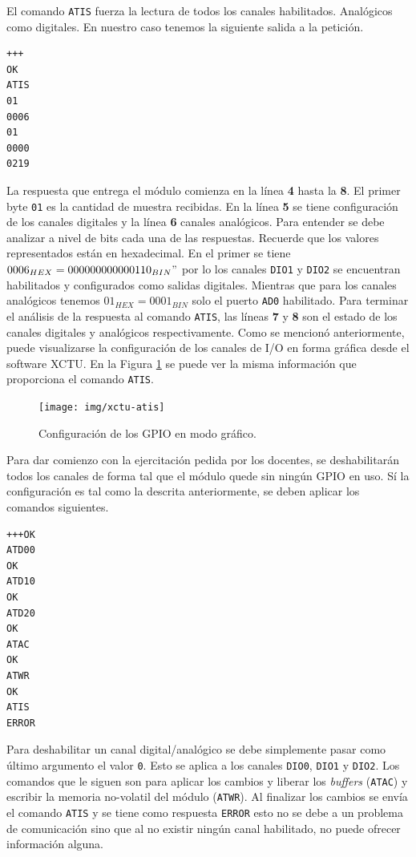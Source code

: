 \documentclass[11pt,oneside,spanish,a4paper]{article}
\begin{document}
El comando \texttt{ATIS} fuerza la lectura de todos los canales
habilitados. Analógicos como digitales. En nuestro caso tenemos la
siguiente salida a la petición.

\begin{lstlisting}[emph={+++,ATIS}, emphstyle={\color{blue}}]
+++
OK
ATIS
01
0006
01
0000
0219
\end{lstlisting}

La respuesta que entrega el módulo comienza en la línea \textbf{4}
hasta la \textbf{8}. El primer byte \texttt{01} es la cantidad de
muestra recibidas. En la línea \textbf{5} se tiene configuración de
los canales digitales y la línea \textbf{6} canales analógicos. Para
entender se debe analizar a nivel de bits cada una de las
respuestas. Recuerde que los valores representados están en
hexadecimal. En el primer se tiene $0006_{HEX} =
000000000000110_{BIN}"$ por lo los canales \texttt{DIO1} y
\texttt{DIO2} se encuentran habilitados y configurados como salidas
digitales. Mientras que para los canales analógicos tenemos
$01_{HEX} = 0001_{BIN}$ solo el puerto \texttt{AD0} habilitado. Para
terminar el análisis de la respuesta al comando \texttt{ATIS}, las
líneas \textbf{7} y \textbf{8} son el estado de los canales
digitales y analógicos respectivamente. Como se mencionó
anteriormente, puede visualizarse la configuración de los canales de
I/O en forma gráfica desde el software XCTU. En la Figura
\ref{fig:xctu-setup} se puede ver la misma información que
proporciona el comando \texttt{ATIS}.

\begin{figure}[h]
  \centering
  \texttt{[image: img/xctu-atis]}
  \caption{Configuración de los GPIO en modo gráfico.}
  \label{fig:xctu-setup}
\end{figure}

Para dar comienzo con la ejercitación pedida por los docentes, se
deshabilitarán todos los canales de forma tal que el módulo quede sin
ningún GPIO en uso. Sí la configuración es tal como la descrita
anteriormente, se deben aplicar los comandos siguientes.

\noindent\begin{minipage}{.25\textwidth}
\begin{lstlisting}[emph={+++,ATIS,ATD00,ATD10,ATD20,ATWR,ATAC}, emphstyle={\color{blue}}]
+++OK
ATD00
OK
ATD10
OK
ATD20
OK
ATAC
OK
ATWR
OK
ATIS
ERROR
\end{lstlisting}
\end{minipage} \hfill
\begin{minipage}{.70\textwidth}
Para deshabilitar un canal digital/analógico se debe simplemente pasar
como último argumento el valor \texttt{0}. Esto se aplica a los
canales \texttt{DIO0}, \texttt{DIO1} y \texttt{DIO2}. Los comandos que
le siguen son para aplicar los cambios y liberar los \textsl{buffers}
(\texttt{ATAC}) y  escribir la
memoria no-volatil del módulo (\texttt{ATWR}). Al finalizar los
cambios se envía el comando \texttt{ATIS} y se tiene como respuesta
\texttt{ERROR} esto no se debe a un problema de comunicación sino que
al no existir ningún canal habilitado, no puede ofrecer información
alguna. 
\end{minipage}
\end{document}
